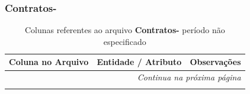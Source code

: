 \subsubsection{Contratos-}

\small
\begin{longtable}{|p{4.0cm}|p{5.0cm}|p{5.5cm}|}
\caption{Colunas referentes ao arquivo \textbf{Contratos-} período não especificado}
\label{tabela-mapeamento-base-grupo-Contratos--periodo-unico} \\ 
    \hline
    \textbf{Coluna no Arquivo} & \textbf{Entidade / Atributo} & \textbf{Observações} \\ \hline
    \endhead

    \hline \multicolumn{3}{r}{\textit{Continua na próxima página}} \\ \hline
    \endfoot

    \hline
    \endlastfoot


\end{longtable}
